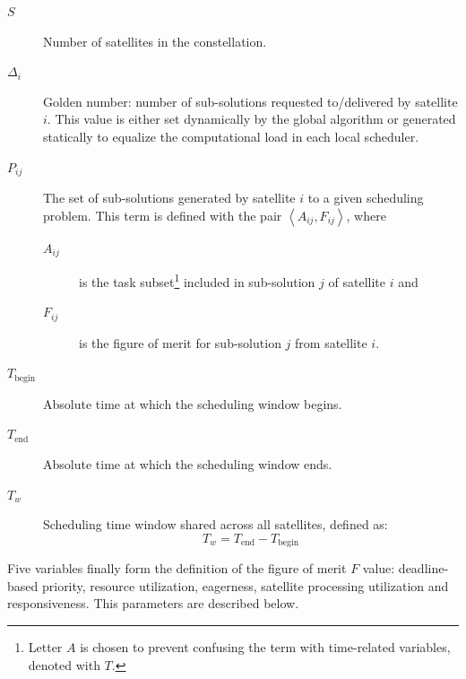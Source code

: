 \begin{description}
\item[$S$] Number of satellites in the constellation.
\item[$\Delta_i$] Golden number: number of sub-solutions requested to/delivered by satellite $i$. This value is either set dynamically by the global algorithm or generated statically to equalize the computational load in each local scheduler.
\item[$P_{ij}$] The set of sub-solutions generated by satellite $i$ to a given scheduling problem. This term is defined with the pair $\left\langle A_{ij}, F_{ij}\right\rangle$, where
\begin{description}
\item[$A_{ij}$] is the task subset\footnote{Letter $A$ is chosen to prevent confusing the term with time-related variables, denoted with $T$.} included in sub-solution $j$ of satellite $i$ and
\item[$F_{ij}$] is the figure of merit for sub-solution $j$ from satellite $i$.
\end{description}
\item[$T_\mathrm{begin}$] Absolute time at which the scheduling window begins. 
\item[$T_\mathrm{end}$] Absolute time at which the scheduling window ends.
\item[$T_w$] Scheduling time window shared across all satellites, defined as:
\begin{equation}
T_w = T_\text{end} - T_\text{begin}
\end{equation}
\end{description}

Five variables finally form the definition of the figure of merit $F$ value: deadline-based priority, resource utilization, eagerness, satellite processing utilization and responsiveness. This parameters are described below.

